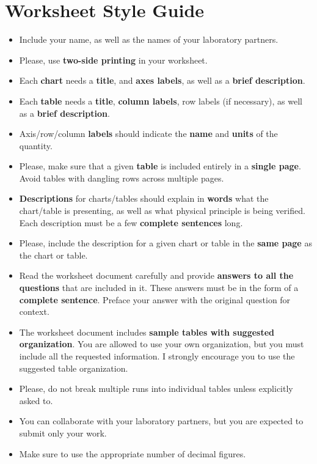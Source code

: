 \chapter{Worksheet Style Guide}
%
\begin{itemize}
    \item Include your name, as well as the names of your laboratory partners.
    \item Please, use \textbf{two-side printing} in your worksheet.
    \item Each \textbf{chart} needs a \textbf{title}, and \textbf{axes labels}, as well as a \textbf{brief description}.
    \item Each \textbf{table} needs a \textbf{title}, \textbf{column labels}, row labels (if necessary), as well as a \textbf{brief description}.
    \item Axis/row/column \textbf{labels} should indicate the \textbf{name} and \textbf{units} of the quantity.
    \item Please, make sure that a given \textbf{table} is included entirely in a \textbf{single page}. Avoid tables with dangling rows across multiple pages.
    \item \textbf{Descriptions} for charts/tables should explain in \textbf{words} what the chart/table is presenting, as well as what physical principle is being verified. Each description must be a few \textbf{complete sentences} long.
    \item Please, include the description for a given chart or table in the \textbf{same page} as the chart or table.
    \item Read the worksheet document carefully and provide \textbf{answers to all the questions} that are included in it. These answers must be in the form of a \textbf{complete sentence}. Preface your answer with the original question for context.
    \item The worksheet document includes \textbf{sample tables with suggested organization}. You are allowed to use your own organization, but you must include all the requested information. I strongly encourage you to use the suggested table organization.
    \item Please, do not break multiple runs into individual tables unless explicitly asked to.
    \item You can collaborate with your laboratory partners, but you are expected to submit only your work.
    \item Make sure to use the appropriate number of decimal figures.
\end{itemize}
%
